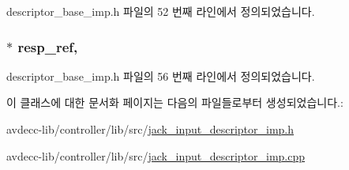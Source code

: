 descriptor\+\_\+base\+\_\+imp.\+h 파일의 52 번째 라인에서 정의되었습니다.

\subsubsection[{\texorpdfstring{resp\+\_\+ref}{resp_ref}}]{$\ast$ resp\+\_\+ref\hspace{0.3cm}{\ttfamily [protected]}, {\ttfamily [inherited]}}\hypertarget{classavdecc__lib_1_1descriptor__base__imp_a2642e3a7c10d38553e7ff4a55e875346}{}\label{classavdecc__lib_1_1descriptor__base__imp_a2642e3a7c10d38553e7ff4a55e875346}


descriptor\+\_\+base\+\_\+imp.\+h 파일의 56 번째 라인에서 정의되었습니다.



이 클래스에 대한 문서화 페이지는 다음의 파일들로부터 생성되었습니다.\+:\begin{DoxyCompactItemize}
\item 
avdecc-\/lib/controller/lib/src/\hyperlink{jack__input__descriptor__imp_8h}{jack\+\_\+input\+\_\+descriptor\+\_\+imp.\+h}\item 
avdecc-\/lib/controller/lib/src/\hyperlink{jack__input__descriptor__imp_8cpp}{jack\+\_\+input\+\_\+descriptor\+\_\+imp.\+cpp}\end{DoxyCompactItemize}
